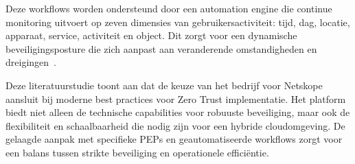 Deze workflows worden ondersteund door een automation engine die continue monitoring uitvoert op zeven dimensies van gebruikersactiviteit: tijd, dag, locatie, apparaat, service, activiteit en object. Dit zorgt voor een dynamische beveiligingsposture die zich aanpast aan veranderende omstandigheden en dreigingen~\autocite{Netskope2020}.

Deze literatuurstudie toont aan dat de keuze van het bedrijf voor Netskope aansluit bij moderne best practices voor Zero Trust implementatie. Het platform biedt niet alleen de technische capabilities voor robuuste beveiliging, maar ook de flexibiliteit en schaalbaarheid die nodig zijn voor een hybride cloudomgeving. De gelaagde aanpak met specifieke PEPs en geautomatiseerde workflows zorgt voor een balans tussen strikte beveiliging en operationele efficiëntie.





